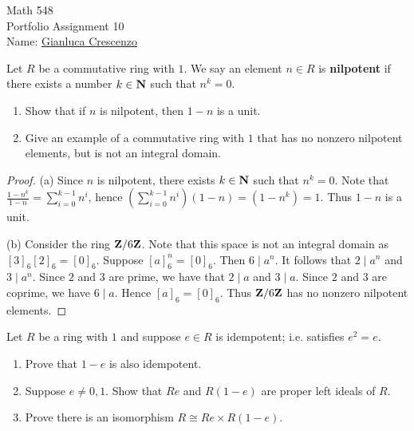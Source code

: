 \documentclass[11pt,twoside,openany]{memoir}
\begin{document}
\begin{center}
    {\Large Math 548 \\[0.1in]Portfolio Assignment 10}\\[.175in]
    {Name:} {\underline{Gianluca Crescenzo\hspace*{2in}}}\\[0.15in]
    \end{center}
    \vspace{4pt}
\begin{problem}[F20, P4]
Let $R$ be a commutative ring with $1$. We say an element $n \in R$ is \textbf{nilpotent} if there exists a number $k \in \mathbf{N}$ such that $n^k = 0$.
\begin{enumerate}[label = (\alph*),itemsep=1pt,topsep=3pt]
    \item Show that if $n$ is nilpotent, then $1-n$ is a unit.
    \item Give an example of a commutative ring with $1$ that has no nonzero nilpotent elements, but is not an integral domain.
\end{enumerate}
\end{problem}
    {\color{blue} \begin{proof}
        (a) Since $n$ is nilpotent, there exists $k \in \mathbf{N}$ such that $n^k = 0$. Note that $\frac{1-n^k}{1-n} = \sum_{i = 0}^{k-1}n^i$, hence $\left(\sum_{i = 0}^{k-1}n^i  \right)(1-n) = (1-n^k)=1$. Thus $1-n$ is a unit.

        (b) Consider the ring $\mathbf{Z}/6\mathbf{Z}$. Note that this space is not an integral domain as $[3]_6[2]_6 = [0]_6$. Suppose $[a]_6^n = [0]_6$. Then $6 \mid a^n$. It follows that $2 \mid a^n$ and $3 \mid a^n$. Since $2$ and $3$ are prime, we have that $2 \mid a$ and $3 \mid a$. Since $2$ and $3$ are coprime, we have $6 \mid a$. Hence $[a]_6 = [0]_6$. Thus $\mathbf{Z}/6\mathbf{Z}$ has no nonzero nilpotent elements. 
    \end{proof}}
\begin{problem}[F20, P5]
Let $R$ be a ring with $1$ and suppose $e \in R$ is idempotent; i.e. satisfies $e^2 = e$.
\begin{enumerate}[label = (\alph*),itemsep=1pt,topsep=3pt]
    \item Prove that $1-e$ is also idempotent.
    \item Suppose $e\neq 0,1$. Show that $Re$ and $R(1-e)$ are proper left ideals of $R$.
    \item Prove there is an isomorphism $R \cong Re \times R(1-e)$.
\end{enumerate}
\end{problem}
\end{document}
